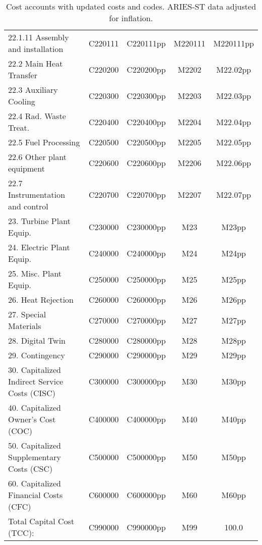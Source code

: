 \begin{table}[h!]
{\begin{tabular}{lcccc}
\hspace{15mm}22.1.11 Assembly and installation & C220111 & C220111pp & M220111 & M220111pp \\
\hspace{10mm}22.2 Main Heat Transfer & C220200 & C220200pp & M2202 & M22.02pp \\
\hspace{10mm}22.3 Auxiliary Cooling & C220300 & C220300pp & M2203 & M22.03pp \\
\hspace{10mm}22.4 Rad. Waste Treat. & C220400 & C220400pp & M2204 & M22.04pp \\
\hspace{10mm}22.5 Fuel Processing & C220500 & C220500pp & M2205 & M22.05pp \\
\hspace{10mm}22.6 Other plant equipment & C220600 & C220600pp & M2206 & M22.06pp \\
\hspace{10mm}22.7 Instrumentation and control & C220700 & C220700pp & M2207 & M22.07pp \\
\hspace{5mm}23. Turbine Plant Equip. & C230000 & C230000pp & M23 & M23pp \\
\hspace{5mm}24. Electric Plant Equip. & C240000 & C240000pp & M24 & M24pp \\
\hspace{5mm}25. Misc. Plant Equip. & C250000 & C250000pp & M25 & M25pp \\
\hspace{5mm}26. Heat Rejection & C260000 & C260000pp & M26 & M26pp \\
\hspace{5mm}27. Special Materials & C270000 & C270000pp & M27 & M27pp \\
\hspace{5mm}28. Digital Twin & C280000 & C280000pp & M28 & M28pp \\
\hspace{5mm}29. Contingency & C290000 & C290000pp & M29 & M29pp \\
30. Capitalized Indirect Service Costs (CISC) & C300000 & C300000pp & M30 & M30pp \\
40. Capitalized Owner’s Cost (COC) & C400000 & C400000pp & M40 & M40pp \\
50. Capitalized Supplementary Costs (CSC) & C500000 & C500000pp & M50 & M50pp \\
60. Capitalized Financial Costs (CFC) & C600000 & C600000pp & M60 & M60pp \\
\hline
Total Capital Cost (TCC): & C990000 & C990000pp & M99 & 100.0 \\
\hline
\end{tabular}
}
\caption{Cost accounts with updated costs and codes. ARIES-ST data adjusted for inflation.}
\label{tab:costs_updated_codes}
\end{table}


